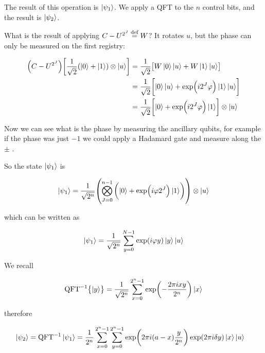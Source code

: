 \documentclass[main.tex]{subfiles}
\begin{document}
The result of this operation is \(\ket{\psi_1} \).
We apply a QFT to the \(n\) control bits, and the result is \(\ket{\psi_2} \).

What is the result of applying \(C-U ^{2^J} \stackrel{\text{def}}{=} W\)? It rotates \(u\), but the phase can only be measured on the first registry:

\begin{subequations}
\begin{align}
  \qty(C-U ^{2^J}) \qty[\frac{1}{\sqrt{2}} (\ket{0} + \ket{1} ) \otimes \ket{u} ]
  &= \frac{1}{\sqrt{2}} \qty[W \ket{0} \ket{u} + W \ket{1} \ket{u} ]  \\
  &= \frac{1}{\sqrt{2}} \qty[\ket{0} \ket{u} + \exp(i 2^J \varphi)  \ket{1} \ket{u} ]  \\
  &=   \frac{1}{\sqrt{2}} \qty[\ket{0} + \exp(i 2^J \varphi) \ket{1}  ] \otimes \ket{u}
\end{align}
\end{subequations}

Now we can see what is the phase by measuring the ancillary qubits, for example if the phase was just \(-1\) we could apply a Hadamard gate and measure along the \(\pm\) .

So the state \(\ket{\psi_1}\) is

\begin{equation}
  \ket{ \psi_1} = \frac{1}{\sqrt{2^n}} \qty(\bigotimes_{J=0}^{n-1} \qty(\ket{0} + \exp(i \varphi 2^J) \ket{1} ) ) \otimes \ket{u}
\end{equation}

which  can be written as

\begin{equation}
  \ket{ \psi_1} = \frac{1}{\sqrt{2^n}} \sum _{y=0}^{N-1} \exp(i \varphi y) \ket{y}
  \ket{u}
\end{equation}


We recall

\begin{equation}
  \text{QFT} ^{-1} \qty{\ket{y}} = \frac{1}{\sqrt{2^n}} \sum _{x=0}   ^{2^n-1} \exp(-\frac{2 \pi ixy}{2^n}) \ket{x}
\end{equation}

therefore

\begin{subequations}
\begin{align}
  \ket{\psi_2} = \text{QFT} ^{-1} \ket{\psi_1} &= \frac{1}{2^n} \sum _{x=0}   ^{2^n-1} \sum _{y=0}   ^{2^n-1} \exp(2 \pi i (a-x) \frac{y}{2^n}) \exp(2 \pi i \delta y ) \ket{x} \ket{u}
\end{align}
\end{subequations}
\end{document}
